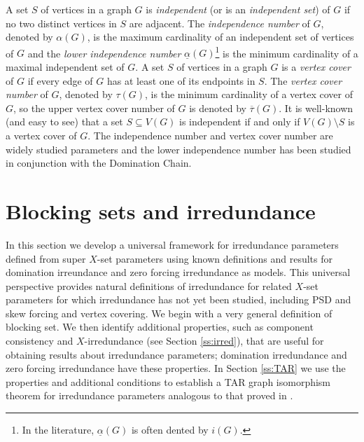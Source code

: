 \documentclass{article}
\numberwithin{figure}{section}
\numberwithin{table}{section}
\numberwithin{equation}{section}
\theoremstyle{definition}
\theoremstyle{definition}
\theoremstyle{definition}
\newcommand{\ol}{\overline}
\newcommand{\vc}{\tau}
\newcommand{\vcbar}{\ol\vc}
\begin{document}
  
A set $S$ of vertices in a graph $G$ is \emph{independent} (or is an \emph{independent set}) of $G$ if no two distinct vertices in $S$ are adjacent.  The \emph{independence number} of $G$, denoted by $\alpha(G)$, is the maximum cardinality of an independent set of vertices of $G$ and the \emph{lower independence number} $\underline{\alpha}(G)$\footnote{In the literature, $\underline{\alpha}(G)$ is often dented by $i(G)$.} is the minimum cardinality of a maximal independent set of $G$. 
A set $S$ of vertices in a graph $G$ is a \emph{vertex cover} of $G$ if every edge of $G$ has at least one of its endpoints in $S$.  
The \emph{vertex cover number} of $G$, denoted by $\vc(G)$, is the minimum cardinality of a vertex cover  of $G$, so the upper vertex cover  number of $G$ is denoted  by $\vcbar(G)$.
It is
well-known (and easy to see) that a set $S\subseteq V(G)$ is independent if and only if $V(G)\setminus S$ is a vertex cover of $G$.  
The independence number and vertex cover number are widely studied parameters and the lower independence number has been studied in conjunction with the Domination Chain.  







\section{Blocking sets and irredundance}\label{s:irred}




In this section we develop a universal framework for irredundance parameters defined from super $X$-set parameters   using known definitions and results for domination irreundance and zero forcing irredundance as models.    This universal perspective  provides natural definitions of irredundance for related $X$-set parameters for which irredundance has not yet been studied, including PSD and skew forcing and vertex covering.  
We begin with a very general definition of blocking set.  We then identify additional properties, such as component consistency and $X$-irredundance (see Section \ref{ss:irred}),
that are useful for obtaining results about irredundance parameters; domination irredundance and zero forcing irredundance have these properties. 
  In Section \ref{ss:TAR} we use the properties and additional conditions to establish a TAR graph isomorphism theorem for irredundance parameters analogous to that proved  in \cite{XTAR-YTAR}.
\end{document}
